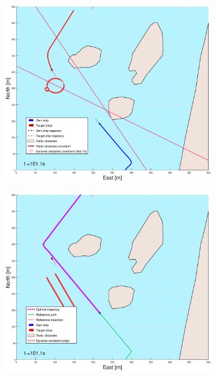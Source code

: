 \begin{figure}[ht]\ContinuedFloat
    \begin{subfigure}[b]{0.49\textwidth}
        \centering
        \includegraphics[width=\textwidth]{Images/Figures/Helloya/_Simple_1fig1_time=101}
    \end{subfigure}
    \hfill
    \begin{subfigure}[b]{0.499\textwidth}
        \centering
        \includegraphics[width=\textwidth]{Images/Figures/Helloya/_Simple_1fig999_time=101}

\end{subfigure}
\end{figure}

